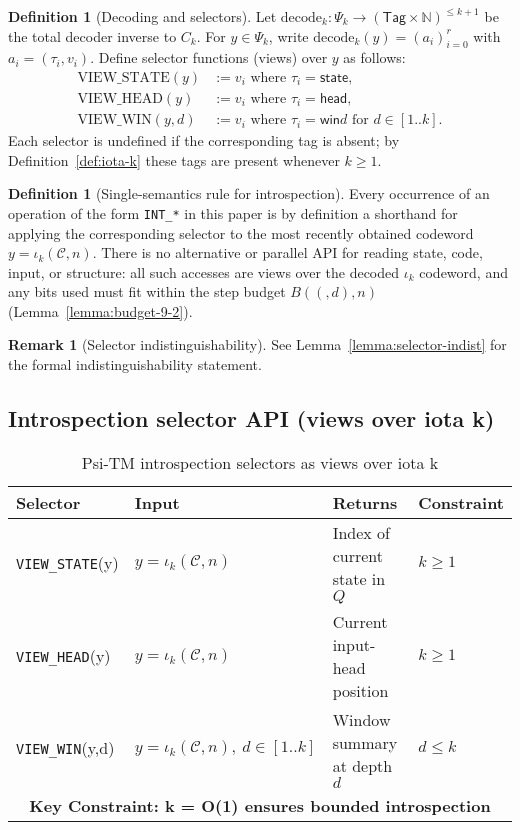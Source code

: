 \documentclass[11pt]{article}
\let\oldlog\log
\renewcommand{\log}{\oldlog_2}
\theoremstyle{plain}
\theoremstyle{definition}
\newtheorem{definition}[theorem]{Definition}
\newtheorem{remark}[theorem]{Remark}
\newcommand{\B}[2]{B(#1,#2)}  %
\begin{document}
\begin{definition}[Decoding and selectors]
Let $\mathrm{decode}_k: \Psi_k \to (\mathsf{Tag}\times\mathbb{N})^{\le k+1}$ be the total decoder inverse to $C_k$. For $y\in\Psi_k$, write $\mathrm{decode}_k(y)=(a_i)_{i=0}^{r}$ with $a_i=(\tau_i,v_i)$. Define selector functions (views) over $y$ as follows:
\begin{align*}
\mathrm{VIEW\_STATE}(y) &:= v_i \text{ where } \tau_i=\textsf{state}, \\
\mathrm{VIEW\_HEAD}(y) &:= v_i \text{ where } \tau_i=\textsf{head}, \\
\mathrm{VIEW\_WIN}(y,d) &:= v_i \text{ where } \tau_i=\textsf{win}d \text{ for } d\in[1..k].
\end{align*}
Each selector is undefined if the corresponding tag is absent; by Definition~\ref{def:iota-k} these tags are present whenever $k\ge 1$.
\end{definition}

\begin{definition}[Single-semantics rule for introspection]
Every occurrence of an operation of the form \texttt{INT\_*} in this paper is by definition a shorthand for applying the corresponding selector to the most recently obtained codeword $y=\iota_k(\mathcal{C},n)$. There is no alternative or parallel API for reading state, code, input, or structure: all such accesses are views over the decoded $\iota_k$ codeword, and any bits used must fit within the step budget $\B(d,n)$ (Lemma~\ref{lemma:budget-9-2}).
\end{definition}

\begin{remark}[Selector indistinguishability]
See Lemma~\ref{lemma:selector-indist} for the formal indistinguishability statement.
\end{remark}

\subsection{Introspection selector API (views over iota k)}

\begin{table}[ht]
\centering
\caption{Psi-TM introspection selectors as views over iota k}
\label{tab:introspection-api}
\begin{tabular}{|l|l|l|l|}
\hline
\textbf{Selector} & \textbf{Input} & \textbf{Returns} & \textbf{Constraint} \\
\hline
\texttt{VIEW\_STATE}(y) & $y=\iota_k(\mathcal{C},n)$ & Index of current state in $Q$ & $k \ge 1$ \\
\hline
\texttt{VIEW\_HEAD}(y) & $y=\iota_k(\mathcal{C},n)$ & Current input-head position & $k \ge 1$ \\
\hline
\texttt{VIEW\_WIN}(y,d) & $y=\iota_k(\mathcal{C},n),\ d\in[1..k]$ & Window summary at depth $d$ & $d \le k$ \\
\hline
\multicolumn{4}{|c|}{\textbf{Key Constraint: k = O(1) ensures bounded introspection}} \\
\hline
\end{tabular}
\end{table}
\end{document}
